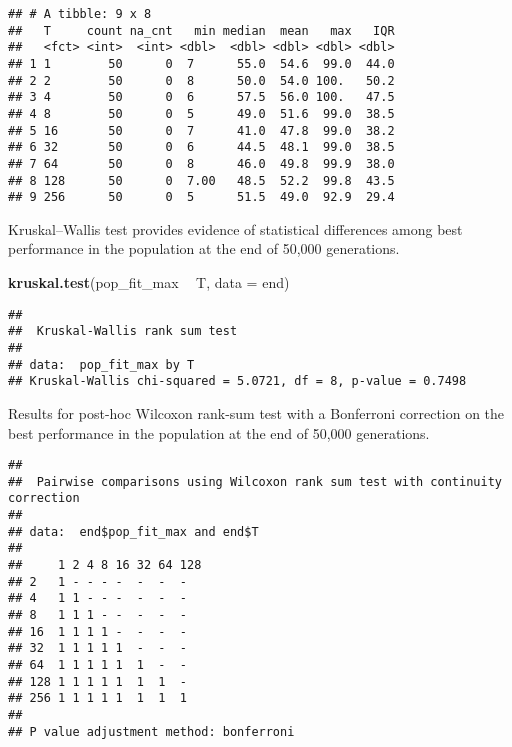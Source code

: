 \documentclass[]{book}
\newenvironment{Shaded}{\begin{snugshade}}{\end{snugshade}}
\newcommand{\DataTypeTok}[1]{\textcolor[rgb]{0.13,0.29,0.53}{#1}}
\newcommand{\KeywordTok}[1]{\textcolor[rgb]{0.13,0.29,0.53}{\textbf{#1}}}
\newcommand{\NormalTok}[1]{#1}
\newcommand{\OperatorTok}[1]{\textcolor[rgb]{0.81,0.36,0.00}{\textbf{#1}}}
\newcommand{\OtherTok}[1]{\textcolor[rgb]{0.56,0.35,0.01}{#1}}
\newcommand{\StringTok}[1]{\textcolor[rgb]{0.31,0.60,0.02}{#1}}
\begin{document}
\begin{verbatim}
## # A tibble: 9 x 8
##   T     count na_cnt   min median  mean   max   IQR
##   <fct> <int>  <int> <dbl>  <dbl> <dbl> <dbl> <dbl>
## 1 1        50      0  7      55.0  54.6  99.0  44.0
## 2 2        50      0  8      50.0  54.0 100.   50.2
## 3 4        50      0  6      57.5  56.0 100.   47.5
## 4 8        50      0  5      49.0  51.6  99.0  38.5
## 5 16       50      0  7      41.0  47.8  99.0  38.2
## 6 32       50      0  6      44.5  48.1  99.0  38.5
## 7 64       50      0  8      46.0  49.8  99.9  38.0
## 8 128      50      0  7.00   48.5  52.2  99.8  43.5
## 9 256      50      0  5      51.5  49.0  92.9  29.4
\end{verbatim}

Kruskal--Wallis test provides evidence of statistical differences among best performance in the population at the end of 50,000 generations.

\begin{Shaded}
\begin{Highlighting}[]
\KeywordTok{kruskal.test}\NormalTok{(pop_fit_max }\OperatorTok{~}\StringTok{ }\NormalTok{T, }\DataTypeTok{data =}\NormalTok{ end)}
\end{Highlighting}
\end{Shaded}

\begin{verbatim}
## 
##  Kruskal-Wallis rank sum test
## 
## data:  pop_fit_max by T
## Kruskal-Wallis chi-squared = 5.0721, df = 8, p-value = 0.7498
\end{verbatim}

Results for post-hoc Wilcoxon rank-sum test with a Bonferroni correction on the best performance in the population at the end of 50,000 generations.

\begin{Shaded}
\end{Shaded}

\begin{verbatim}
## 
##  Pairwise comparisons using Wilcoxon rank sum test with continuity correction 
## 
## data:  end$pop_fit_max and end$T 
## 
##     1 2 4 8 16 32 64 128
## 2   1 - - - -  -  -  -  
## 4   1 1 - - -  -  -  -  
## 8   1 1 1 - -  -  -  -  
## 16  1 1 1 1 -  -  -  -  
## 32  1 1 1 1 1  -  -  -  
## 64  1 1 1 1 1  1  -  -  
## 128 1 1 1 1 1  1  1  -  
## 256 1 1 1 1 1  1  1  1  
## 
## P value adjustment method: bonferroni
\end{verbatim}
\end{document}
